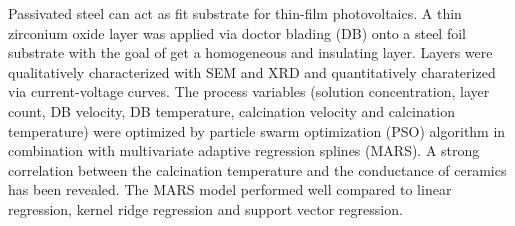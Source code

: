 Passivated steel can act as fit substrate for thin-film photovoltaics.
A thin zirconium oxide layer was applied via doctor blading (DB) onto a steel foil substrate with the goal of get a homogeneous and insulating layer.
Layers were qualitatively characterized with SEM and XRD and quantitatively charaterized via current-voltage curves.
The process variables (solution concentration, layer count, DB velocity, DB temperature, calcination velocity and calcination temperature) were optimized by particle swarm optimization (PSO) algorithm in combination with multivariate adaptive regression splines (MARS).
A strong correlation between the calcination temperature and the conductance of ceramics has been revealed. 
The MARS model performed well compared to 
linear regression, kernel ridge regression and support vector regression.
